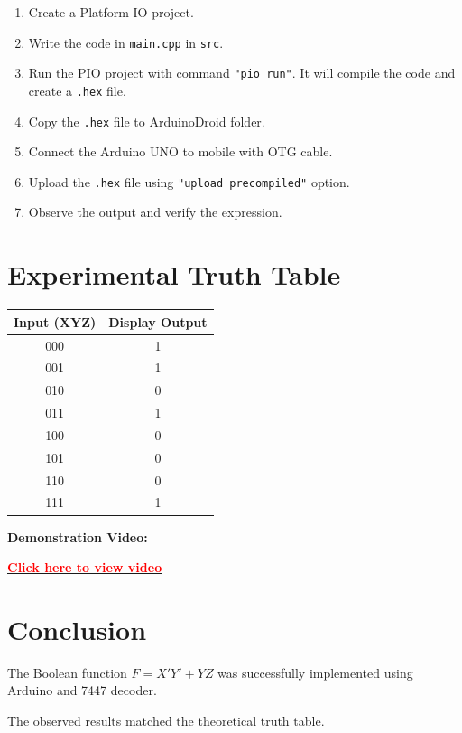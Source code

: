 \documentclass[12pt,a4paper]{article}
\newcommand{\bluesection}[1]{
\section*{\color{blue}#1}
}
\begin{document}
\begin{enumerate}
    \item Create a Platform IO project.
    \item Write the code in \texttt{main.cpp} in \texttt{src}.
    \item Run the PIO project with command \texttt{"pio run"}. It will compile the code and create a \texttt{.hex} file.
    \item Copy the \texttt{.hex} file to ArduinoDroid folder.
    \item Connect the Arduino UNO to mobile with OTG cable.
    \item Upload the \texttt{.hex} file using \texttt{"upload precompiled"} option.
    \item Observe the output and verify the expression.
\end{enumerate}

\bluesection{Experimental Truth Table}

\begin{center}
\begin{tabular}{|c|c|}
\hline
Input (XYZ) & Display Output \\ \hline
000 & 1 \\ \hline
001 & 1 \\ \hline
010 & 0 \\ \hline
011 & 1 \\ \hline
100 & 0 \\ \hline
101 & 0 \\ \hline
110 & 0 \\ \hline
111 & 1 \\ \hline
\end{tabular}
\end{center}

\vspace{0.5cm}

\textbf{Demonstration Video:}

\begin{center}
\href{https://drive.google.com/file/d/11Zgyzvozw86l4o7JobIPC_WUqTXhcAwR/view?usp=drivesdk/}{\textbf{\textcolor{red}{Click here to view video}}}
\end{center}

\bluesection{Conclusion}

The Boolean function $F = X'Y' + YZ$ was successfully implemented using Arduino and 7447 decoder.  

The observed results matched the theoretical truth table.
\end{document}
